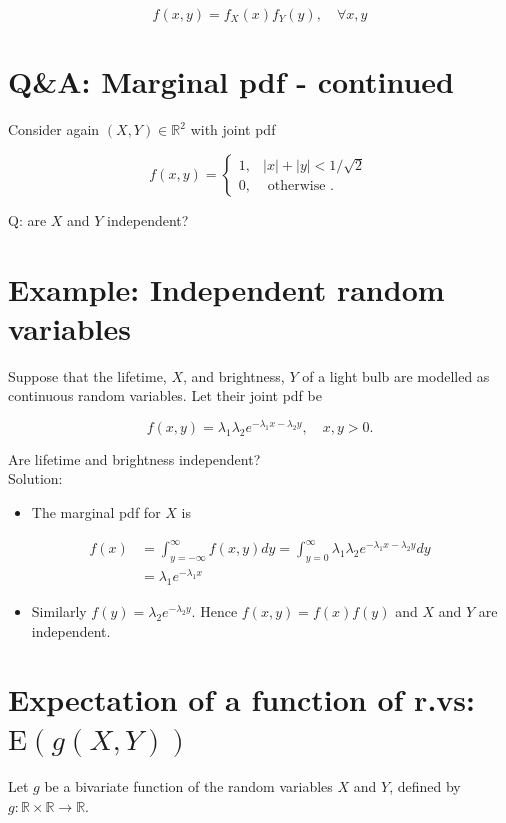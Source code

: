 \documentclass[10pt]{article}
\begin{document}
$$
f(x, y)=f_{X}(x) f_{Y}(y), \quad \forall x, y
$$

\section*{Q\&A: Marginal pdf - continued}
Consider again $(X, Y) \in \mathbb{R}^{2}$ with joint pdf

$$
f(x, y)= \begin{cases}1, & |x|+|y|<1 / \sqrt{2} \\ 0, & \text { otherwise } .\end{cases}
$$

Q: are $X$ and $Y$ independent?

\section*{Example: Independent random variables}
Suppose that the lifetime, $X$, and brightness, $Y$ of a light bulb are modelled as continuous random variables. Let their joint pdf be

$$
f(x, y)=\lambda_{1} \lambda_{2} e^{-\lambda_{1} x-\lambda_{2} y}, \quad x, y>0 .
$$

Are lifetime and brightness independent?\\
Solution:

\begin{itemize}
  \item The marginal pdf for $X$ is
\end{itemize}

$$
\begin{aligned}
f(x) & =\int_{y=-\infty}^{\infty} f(x, y) d y=\int_{y=0}^{\infty} \lambda_{1} \lambda_{2} e^{-\lambda_{1} x-\lambda_{2} y} d y \\
& =\lambda_{1} e^{-\lambda_{1} x}
\end{aligned}
$$

\begin{itemize}
  \item Similarly $f(y)=\lambda_{2} e^{-\lambda_{2} y}$. Hence $f(x, y)=f(x) f(y)$ and $X$ and $Y$ are independent.
\end{itemize}

\section*{Expectation of a function of r.vs: $\mathrm{E}(g(X, Y))$}
Let $g$ be a bivariate function of the random variables $X$ and $Y$, defined by $g: \mathbb{R} \times \mathbb{R} \rightarrow \mathbb{R}$.
\end{document}
